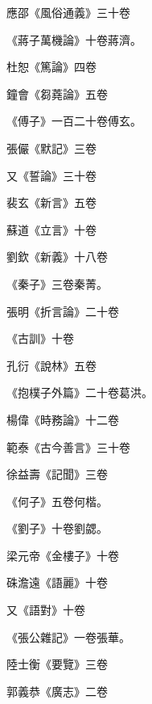 \begin{pinyinscope}
 應邵《風俗通義》三十卷



 《蔣子萬機論》十卷蔣濟。



 杜恕《篤論》四卷



 鐘會《芻蕘論》五卷



 《傅子》一百二十卷傅玄。



 張儼《默記》三卷



 又《誓論》三十卷



 裴玄《新言》五卷



 蘇道《立言》十卷



 劉欽《新義》十八卷



 《秦子》三卷秦菁。



 張明《折言論》二十卷



 《古訓》十卷



 孔衍《說林》五卷



 《抱樸子外篇》二十卷葛洪。



 楊偉《時務論》十二卷



 範泰《古今善言》三十卷



 徐益壽《記聞》三卷



 《何子》五卷何楷。



 《劉子》十卷劉勰。



 梁元帝《金樓子》十卷



 硃澹遠《語麗》十卷



 又《語對》十卷



 《張公雜記》一卷張華。



 陸士衡《要覽》三卷



 郭義恭《廣志》二卷




\end{pinyinscope}
